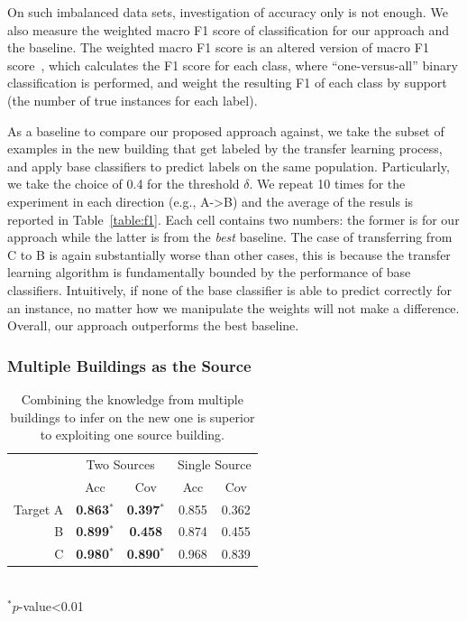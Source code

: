 On such imbalanced data sets, investigation of accuracy only is not enough. We also measure the weighted macro F1 score of classification for our approach and the baseline. The weighted macro F1 score is an altered version of macro F1 score~\cite{yang}, which calculates the F1 score for each class, where ``one-versus-all'' binary classification is performed, and weight the resulting F1 of each class by support (the number of true instances for each label). 

As a baseline to compare our proposed approach against, we take the subset of examples in the new building that get labeled by the transfer learning process, and apply base classifiers to predict labels on the same population. 
Particularly, we take the choice of 0.4 for the threshold $\delta$. 
We repeat 10 times for the experiment in each direction (e.g., A->B) and the average of the resuls is reported in Table~\ref{table:f1}. 
Each cell contains two numbers: the former is for our approach while the latter is from the {\it best} baseline.
The case of transferring from C to B is again substantially worse than other cases, this is because the transfer learning algorithm is fundamentally bounded by the performance of base classifiers. Intuitively, if none of the base classifier is able to predict correctly for an instance, no matter how we manipulate the weights will not make a difference.
Overall, our approach outperforms the best baseline.


\subsubsection{Multiple Buildings as the Source}

\begin{table}[h]
\centering
\begin{tabular}{r|cc|cc}
\hline
\multirow{2}{*}{} & \multicolumn{2}{c|}{Two Sources} & \multicolumn{2}{c}{Single Source} \\ \cline{2-5} 
 & Acc & Cov & Acc & Cov \\ \hline
Target A & {\bf 0.863$^\ast$} & {\bf 0.397$^\ast$} & 0.855 & 0.362 \\ \hline
B & {\bf 0.899$^\ast$} & {\bf 0.458} & 0.874 & 0.455 \\ \hline
C & {\bf 0.980$^\ast$} & {\bf 0.890$^\ast$} & 0.968 & 0.839 \\ \hline
\end{tabular}
\\\noindent
$^\ast p$-value<0.01
\caption{Combining the knowledge from multiple buildings to infer on the new one is superior to exploiting one source building.}
\label{2source}
\end{table}


